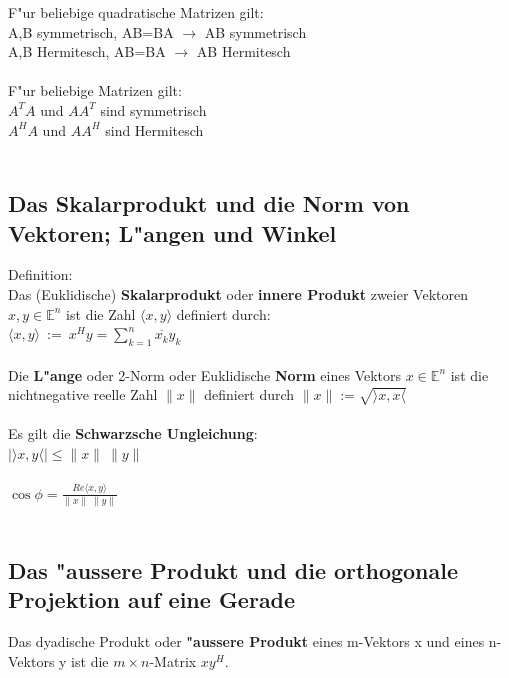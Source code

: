 \documentclass[10pt, a4paper, twocolumn]{scrartcl}
\begin{document}
F"ur beliebige quadratische Matrizen gilt:\\
A,B symmetrisch, AB=BA $\rightarrow$ AB symmetrisch\\
A,B Hermitesch, AB=BA $\rightarrow$ AB Hermitesch\\\\

F"ur beliebige Matrizen gilt:\\
$A^TA$ und $AA^T$ sind symmetrisch\\
$A^HA$ und $AA^H$ sind Hermitesch\\\\


\subsection{Das Skalarprodukt und die Norm von Vektoren; L"angen und Winkel}

Definition:\\
Das (Euklidische) {\bf Skalarprodukt} oder {\bf innere Produkt} zweier Vektoren $x,y\in \mathbb{E}^n$ ist die Zahl $\langle x,y \rangle$ definiert durch:\\
$\langle x,y \rangle\: :=\: x^Hy=\sum^n_{k=1}\overline{x_k}y_k$\\\\

Die {\bf L"ange} oder 2-Norm oder Euklidische {\bf Norm} eines Vektors $x\in\mathbb{E}^n$ ist die nichtnegative reelle Zahl $\|x\|$ definiert durch $\|x\|:=\sqrt{\rangle x,x \langle}$\\\\

Es gilt die {\bf Schwarzsche Ungleichung}:\\
$|\rangle x,y \langle |\leq\|x\|\:\|y\|$\\\\

$\cos\phi=\frac{Re \langle x,y \rangle}{\|x\|\:\|y\|}$\\\\

\subsection{Das "aussere Produkt und die orthogonale Projektion auf eine Gerade}

Das dyadische Produkt oder {\bf "aussere Produkt} eines m-Vektors x und eines n-Vektors y ist die $m \times n$-Matrix $xy^H$.\\\\
\end{document}
